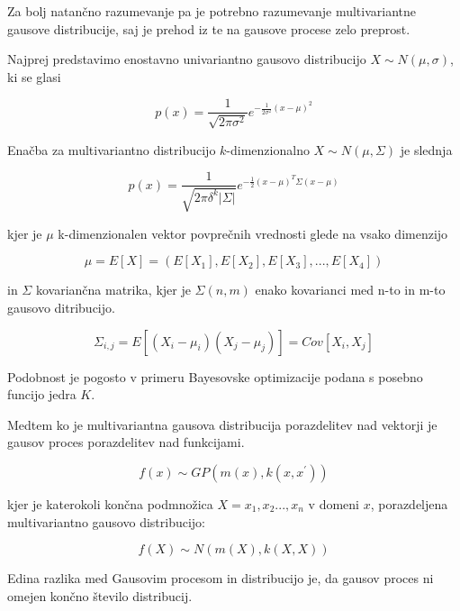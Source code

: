 \documentclass[a4paper, 12pt]{book}
\begin{document}
Za bolj natančno razumevanje pa je potrebno razumevanje multivariantne gausove distribucije, saj je prehod iz te na gausove procese zelo preprost.
\par Najprej predstavimo enostavno univariantno gausovo distribucijo $X \sim N(\mu, \sigma)$, ki se glasi

\begin{equation}
	p(x) = \frac{1}{\sqrt{2\pi\sigma^2}}e^{-\frac{1}{2\sigma^2}{(x-\mu)}^2}
\end{equation}

Enačba za multivariantno distribucijo $k$-dimenzionalno $X \sim N(\mu, \Sigma)$ je slednja

\begin{equation}
	p(x) = \frac{1}{\sqrt{2\pi\delta^k|\Sigma|}}e^{-\frac{1}{2}{(x-\mu)}^T\Sigma{(x-\mu)}}
\end{equation}

kjer je $\mu$ k-dimenzionalen vektor povprečnih vrednosti glede na vsako dimenzijo

\begin{equation}
	\mu = E[X] = (E[X_1],E[X_2],E[X_3],...,E[X_4])
\end{equation}

 in $\Sigma$ kovariančna matrika, kjer je $\Sigma (n,m)$ enako kovarianci med n-to in m-to gausovo ditribucijo.
 
 \begin{equation}
	\Sigma_{i,j} = E[(X_i - \mu_i)(X_j - \mu_j)] = Cov[X_i, X_j]
\end{equation}
 
Podobnost je pogosto v primeru Bayesovske optimizacije podana s posebno funcijo jedra $K$.
\par Medtem ko je multivariantna gausova distribucija porazdelitev nad vektorji je gausov proces porazdelitev nad funkcijami.

 \begin{equation}
	f(x) \sim GP(m(x), k(x, x^{'}))
\end{equation}

kjer je katerokoli končna podmnožica $X = {x_1, x_2..., x_n}$ v domeni $x$, porazdeljena multivariantno gausovo distribucijo:

\begin{equation}
	f(X) \sim N(m(X), k(X, X))
\end{equation}

Edina razlika med Gausovim procesom in distribucijo je, da gausov proces ni omejen končno število distribucij.
\end{document}

